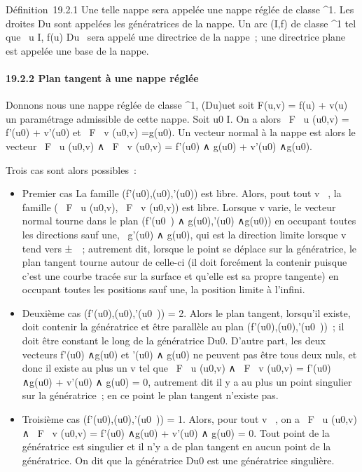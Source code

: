 Définition~19.2.1 Une telle nappe sera appelée une nappe réglée de
classe ^1. Les droites Du sont appelées les
génératrices de la nappe. Un arc (I,f) de classe ^1 tel que
\forall~u \in I, f(u) \in Du~ sera appelé une
directrice de la nappe~; une directrice plane est appelée une base de la
nappe.

\paragraph{19.2.2 Plan tangent à une nappe réglée}

Donnons nous une nappe réglée de classe ^1,
(Du)u\inI et soit F(u,v) = f(u) +
v\vecg(u) un paramétrage admissible de cette nappe.
Soit u0 \in I. On a alors  \partial~F \over \partial~u
(u0,v) = f'(u0) +
v\vecg'(u0) et  \partial~F \over
\partial~v (u0,v) =\vec g(u0). Un
vecteur normal à la nappe est alors le vecteur  \partial~F
\over \partial~u (u0,v) ∧ \partial~F \over
\partial~v (u0,v) = f'(u0) ∧\vec
g(u0) + v\vecg'(u0)
∧\vec g(u0).

Trois cas sont alors possibles~:

\begin{itemize}
\itemsep1pt\parskip0pt
\item
  Premier cas La famille
  (f'(u0),\vecg(u0),\vecg'(u0))
  est libre. Alors, pout tout v \in {}~, la famille ( \partial~F
  \over \partial~u (u0,v), \partial~F \over
  \partial~v (u0,v)) est libre. Lorsque v varie, le vecteur normal
  tourne dans le plan
  \mathrmVect(f'(u0~)
  ∧\vec
  g(u0),\vecg'(u0)
  ∧\vec g(u0)) en occupant toutes les
  directions sauf une, ~g'(u0) ∧\vec
  g(u0), qui est la direction limite lorsque v tend vers
  ±\infty~~; autrement dit, lorsque le point se déplace sur la génératrice, le
  plan tangent tourne autour de celle-ci (il doit forcément la contenir
  puisque c'est une courbe tracée sur la surface et qu'elle est sa
  propre tangente) en occupant toutes les positions sauf une, la
  position limite à l'infini.
\item
  Deuxième cas
  \mathrmrg(f'(u0),\vecg(u0),\vecg'(u0~))
  = 2. Alors le plan tangent, lorsqu'il existe, doit contenir la
  génératrice et être parallèle au plan
  \mathrmVect(f'(u0),\vecg(u0),\vecg'(u0~))~;
  il doit être constant le long de la génératrice
  Du0. D'autre part, les deux vecteurs
  f'(u0) ∧\vec g(u0) et
  \vecg'(u0) ∧\vec
  g(u0) ne peuvent pas être tous deux nuls, et donc il
  existe au plus un v tel que  \partial~F \over \partial~u
  (u0,v) ∧ \partial~F \over \partial~v (u0,v) =
  f'(u0) ∧\vec g(u0) +
  v\vecg'(u0) ∧\vec
  g(u0) = 0, autrement dit il y a au plus un point singulier
  sur la génératrice~; en ce point le plan tangent n'existe pas.
\item
  Troisième cas
  \mathrmrg(f'(u0),\vecg(u0),\vecg'(u0~))
  = 1. Alors, pour tout v \in {}~, on a  \partial~F \over \partial~u
  (u0,v) ∧ \partial~F \over \partial~v (u0,v) =
  f'(u0) ∧\vec g(u0) +
  v\vecg'(u0) ∧\vec
  g(u0) = 0. Tout point de la génératrice est singulier et
  il n'y a de plan tangent en aucun point de la génératrice. On dit que
  la génératrice Du0 est une génératrice singulière.
\end{itemize}

